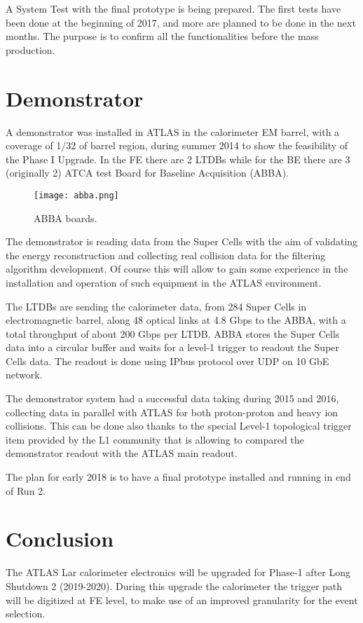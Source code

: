 \documentclass{llncs}
\begin{document}
A System Test with the final prototype is being prepared. The first tests have been done at the beginning of 2017, and more are planned to be done in the next months. The purpose is to confirm all the functionalities before the mass production.

\section{Demonstrator}
A demonstrator was installed in ATLAS in the calorimeter EM barrel, with a coverage of 1/32 of barrel region, during summer 2014 to show the feasibility of the Phase I Upgrade. In the FE there are 2 LTDBs while for the BE there are 3 (originally 2) ATCA test Board for Baseline Acquisition (ABBA).

\begin{wrapfigure}{r}{0.45\textwidth}
\vspace{-20pt}
	\centering
	\texttt{[image: abba.png]}
	\caption{ABBA boards.}
	\label{fig:abba}
 \vspace{-20pt}
\end{wrapfigure}

The demonstrator is reading data from the Super Cells with the aim of validating the energy reconstruction and collecting real collision data for the filtering algorithm development. Of course this will allow to gain some experience in the installation and operation of such equipment in the ATLAS environment.

The LTDBs are sending the calorimeter data, from 284 Super Cells in electromagnetic barrel, along 48 optical links at 4.8 Gbps to the ABBA, with a total throughput of about 200 Gbps per LTDB. ABBA stores the Super Cells data into a circular buffer and waits for a level-1 trigger to readout the Super Cells data. The readout is done using IPbus protocol over UDP on 10 GbE network.

The demonstrator system had a successful data taking during 2015 and 2016, collecting data in parallel with ATLAS for both proton-proton and heavy ion collisions. This can be done also thanks to the special Level-1 topological trigger item provided by the L1 community that is allowing to compared the demonstrator readout with the ATLAS main readout.

The plan for early 2018 is to have a final prototype installed and running in end of Run 2.

\section{Conclusion}
The ATLAS Lar calorimeter electronics will be upgraded for Phase-1 after Long Shutdown 2 (2019-2020). During this upgrade the calorimeter the trigger path will be digitized at FE level, to make use of an improved granularity for the event selection.
\end{document}
